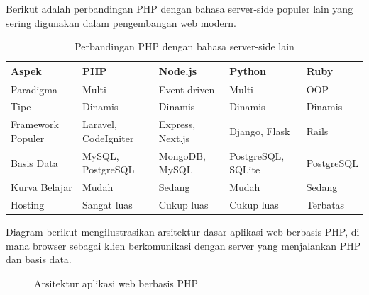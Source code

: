 Berikut adalah perbandingan PHP dengan bahasa server-side populer lain yang sering digunakan dalam pengembangan web modern.

\begin{table}[ht]
\centering
\begin{tabular}{|P{2.5cm}|P{2cm}|P{2.5cm}|P{2.5cm}|P{2.5cm}|}
\hline
\textbf{Aspek} & \textbf{PHP} & \textbf{Node.js} & \textbf{Python} & \textbf{Ruby} \\
\hline
Paradigma & Multi & Event-driven & Multi & OOP \\
\hline
Tipe & Dinamis & Dinamis & Dinamis & Dinamis \\
\hline
Framework Populer & Laravel, CodeIgniter & Express, Next.js & Django, Flask & Rails \\
\hline
Basis Data & MySQL, PostgreSQL & MongoDB, MySQL & PostgreSQL, SQLite & PostgreSQL \\
\hline
Kurva Belajar & Mudah & Sedang & Mudah & Sedang \\
\hline
Hosting & Sangat luas & Cukup luas & Cukup luas & Terbatas \\
\hline
\end{tabular}
\caption{Perbandingan PHP dengan bahasa server-side lain}
\end{table}

Diagram berikut mengilustrasikan arsitektur dasar aplikasi web berbasis PHP, di mana browser sebagai klien berkomunikasi dengan server yang menjalankan PHP dan basis data.

\begin{figure}[ht]
\centering
{}
\caption{Arsitektur aplikasi web berbasis PHP}
\end{figure}

